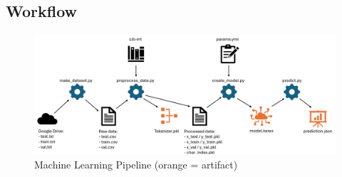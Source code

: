 \subsection{Workflow}


\begin{figure}
    \centering
    \includegraphics[width=0.75\linewidth]{images/ml_pipeline.png}
    \caption{Machine Learning Pipeline (orange = artifact)}
    \label{fig:ml-pipeline}
\end{figure}